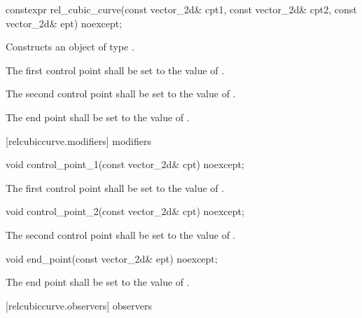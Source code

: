 \begin{itemdecl}
constexpr rel_cubic_curve(const vector_2d& cpt1, const vector_2d& cpt2,
  const vector_2d& ept) noexcept;
\end{itemdecl}
\begin{itemdescr}
\pnum
\effects
Constructs an object of type .

\pnum
The first control point shall be set to the value of .

\pnum
The second control point shall be set to the value of .

\pnum
The end point shall be set to the value of .
\end{itemdescr}

 [relcubiccurve.modifiers]{ modifiers}

\begin{itemdecl}
void control_point_1(const vector_2d& cpt) noexcept;
\end{itemdecl}
\begin{itemdescr}
\pnum
\effects
The first control point shall be set to the value of .
\end{itemdescr}

\begin{itemdecl}
void control_point_2(const vector_2d& cpt) noexcept;
\end{itemdecl}
\begin{itemdescr}
\pnum
\effects
The second control point shall be set to the value of .
\end{itemdescr}

\begin{itemdecl}
void end_point(const vector_2d& ept) noexcept;
\end{itemdecl}
\begin{itemdescr}
\pnum
\effects
The end point shall be set to the value of .
\end{itemdescr}

 [relcubiccurve.observers]{ observers}

